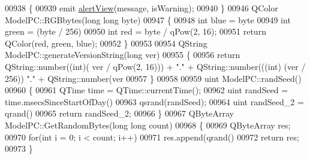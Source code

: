 \begin{DoxyCode}
{00938 \{
00939     emit \hyperlink{class_model_p_c_af0217a7ca5671e26090dc50a5dccdaf5}{alertView}(message, isWarning);
00940 \}
00946 QColor ModelPC::RGBbytes(\textcolor{keywordtype}{long} \textcolor{keywordtype}{long} byte)
00947 \{
00948     \textcolor{keywordtype}{int} blue = byte %
00949     \textcolor{keywordtype}{int} green = (byte / 256) %
00950     \textcolor{keywordtype}{int} red = byte / qPow(2, 16);
00951     \textcolor{keywordflow}{return} QColor(red, green, blue);
00952 \}
00953 
00954 QString ModelPC::generateVersionString(\textcolor{keywordtype}{long} ver)
00955 \{
00956     \textcolor{keywordflow}{return} QString::number((\textcolor{keywordtype}{int})( ver / qPow(2, 16))) + \textcolor{stringliteral}{"."} + QString::number(((\textcolor{keywordtype}{int}) (ver / 256)) %
      "."} + QString::number(ver %
00957 \}
00958 
00959 uint ModelPC::randSeed()
00960 \{
00961     QTime time = QTime::currentTime();
00962     uint randSeed = time.msecsSinceStartOfDay() %
00963     qsrand(randSeed);
00964     uint randSeed\_2 = qrand() %
00965     \textcolor{keywordflow}{return} randSeed\_2;
00966 \}
00967 QByteArray ModelPC::GetRandomBytes(\textcolor{keywordtype}{long} \textcolor{keywordtype}{long} count)
00968 \{
00969     QByteArray res;
00970     \textcolor{keywordflow}{for}(\textcolor{keywordtype}{int} i = 0; i < count; i++)
00971        res.append(qrand() %
00972     \textcolor{keywordflow}{return} res;
00973 \}
\end{DoxyCode}
